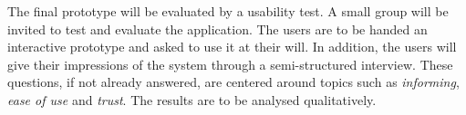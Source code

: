 The final prototype will be evaluated by a usability test. A small group will be invited to test and evaluate the application. The users are to be handed an interactive prototype and asked to use it at their will. In addition, the users will give their impressions of the system through a semi-structured interview. These questions, if not already answered, are centered around topics such as \emph{informing}, \emph{ease of use} and \emph{trust}. The results are to be analysed qualitatively.

